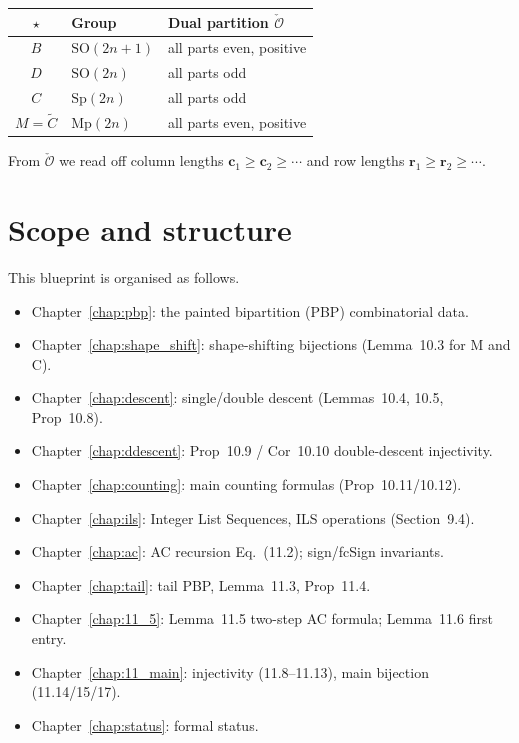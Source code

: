 \begin{center}
\begin{tabular}{c|l|l}
  $\star$ & Group & Dual partition $\check{\mathcal{O}}$ \\\hline
  $B$ & $\mathrm{SO}(2n+1)$ & all parts even, positive \\
  $D$ & $\mathrm{SO}(2n)$   & all parts odd \\
  $C$ & $\mathrm{Sp}(2n)$   & all parts odd \\
  $M = \tilde{C}$ & $\mathrm{Mp}(2n)$ & all parts even, positive \\
\end{tabular}
\end{center}

From $\check{\mathcal{O}}$ we read off column lengths
$\mathbf{c}_1 \geq \mathbf{c}_2 \geq \cdots$ and row lengths
$\mathbf{r}_1 \geq \mathbf{r}_2 \geq \cdots$.

\section{Scope and structure}

This blueprint is organised as follows.

\begin{itemize}
\item Chapter~\ref{chap:pbp}: the painted bipartition (PBP) combinatorial data.
\item Chapter~\ref{chap:shape_shift}: shape-shifting bijections (Lemma~10.3 for M and C).
\item Chapter~\ref{chap:descent}: single/double descent (Lemmas~10.4, 10.5, Prop~10.8).
\item Chapter~\ref{chap:ddescent}: Prop~10.9 / Cor~10.10 double-descent injectivity.
\item Chapter~\ref{chap:counting}: main counting formulas (Prop~10.11/10.12).
\item Chapter~\ref{chap:ils}: Integer List Sequences, ILS operations (Section~9.4).
\item Chapter~\ref{chap:ac}: AC recursion Eq.~(11.2); sign/fcSign invariants.
\item Chapter~\ref{chap:tail}: tail PBP, Lemma~11.3, Prop~11.4.
\item Chapter~\ref{chap:11_5}: Lemma~11.5 two-step AC formula; Lemma~11.6 first entry.
\item Chapter~\ref{chap:11_main}: injectivity (11.8--11.13), main bijection (11.14/15/17).
\item Chapter~\ref{chap:status}: formal status.
\end{itemize}

